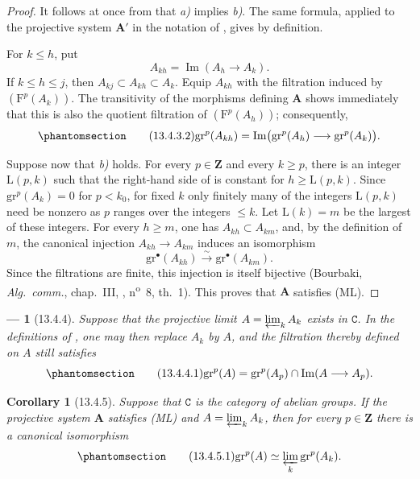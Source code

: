 \documentclass[oneside]{amsart}
\theoremstyle{ega-env-style}
\newtheorem*{env}{---}
\theoremstyle{ega-thm-env-style}
\newtheorem*{corollary}{Corollary}
\theoremstyle{ega-defn-env-style}
\def\bb{\mathbf}                    %
\def\cat{\mathtt}                   %
\def\leq{\leqslant}                 %
\def\geq{\geqslant}                 %
\def\Im{\operatorname{Im}}
\def\isoto{\simeq} %
\def\simto{\xrightarrow{\sim}}
\newcommand{\oldpage}[2][]{{\marginnote{\normalfont{\textbf{#1}~|~#2}}}\ignorespaces}
\let\EGAOriginalLabel\label
\renewcommand{\label}[1]{\phantomsection\EGAOriginalLabel{#1}}
\begin{document}
\begin{proof}
It follows at once from  that \emph{a)} implies
\emph{b)}. The same formula, applied to the projective system
$\bb{A}'$ in the notation of , gives
 by definition.

For $k\leq h$, put
\[
  A_{kh}=\Im(A_h\longrightarrow A_k).
\]
If $k\leq h\leq j$, then
$A_{kj}\subset A_{kh}\subset A_k$.
Equip $A_{kh}$ with the filtration induced by
$(\mathrm{F}^p(A_k))$.
The transitivity of the morphisms defining $\bb{A}$ shows
immediately that this is also the quotient filtration of
$(\mathrm{F}^p(A_h))$; consequently,
\begin{equation}
\label{0.13.4.3.2}
\tag{13.4.3.2}
  \mathrm{gr}^p(A_{kh})
  =
  \Im\bigl(
    \mathrm{gr}^p(A_h)\longrightarrow\mathrm{gr}^p(A_k)
  \bigr).
\end{equation}

\oldpage[0\textsubscript{III}]{71}
Suppose now that \emph{b)} holds.
For every $p\in\bb{Z}$ and every $k\geq p$, there is an integer
$\mathrm{L}(p,k)$ such that the right-hand side of
 is constant for $h\geq\mathrm{L}(p,k)$.
Since $\mathrm{gr}^p(A_k)=0$ for $p<k_0$, for fixed $k$ only
finitely many of the integers $\mathrm{L}(p,k)$ need be nonzero as
$p$ ranges over the integers $\leq k$.
Let $\mathrm{L}(k)=m$ be the largest of these integers.
For every $h\geq m$, one has
$A_{kh}\subset A_{km}$, and, by the definition of $m$, the canonical
injection
$A_{kh}\longrightarrow A_{km}$ induces an isomorphism
\[
  \mathrm{gr}^\bullet(A_{kh})
  \simto
  \mathrm{gr}^\bullet(A_{km}).
\]
Since the filtrations are finite, this injection is itself bijective
(Bourbaki, \emph{Alg.\ comm.}, chap.~III, ,
n\textsuperscript{o}~8, th.~1).
This proves that $\bb{A}$ satisfies (ML).
\end{proof}

\begin{env}[13.4.4]
\label{0.13.4.4}
Suppose that the projective limit
$A=\varprojlim_k A_k$ exists in $\cat{C}$.
In the definitions of , one may then replace $A_k$ by
$A$, and the filtration thereby defined on $A$ still satisfies
\begin{equation}
\label{0.13.4.4.1}
\tag{13.4.4.1}
  \mathrm{gr}^p(A)
  =
  \mathrm{gr}^p(A_p)
  \cap
  \Im(A\longrightarrow A_p).
\end{equation}
\end{env}

\begin{corollary}[13.4.5]
\label{0.13.4.5}
Suppose that $\cat{C}$ is the category of abelian groups.
If the projective system $\bb{A}$ satisfies (ML) and
$A=\varprojlim_k A_k$, then for every $p\in\bb{Z}$ there is a
canonical isomorphism
\begin{equation}
\label{0.13.4.5.1}
\tag{13.4.5.1}
  \mathrm{gr}^p(A)
  \isoto
  \varprojlim_k\mathrm{gr}^p(A_k).
\end{equation}
\end{corollary}
\end{document}
